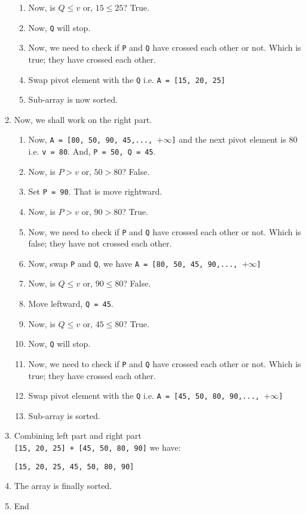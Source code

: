 \documentclass[a4paper,12pt]{article}
\theoremstyle{definition}
\begin{document}
\begin{enumerate}
\begin{enumerate}
            \item Now, is $Q \leq v$ or, $15 \leq 25$? True.
            \item Now, \texttt{Q} will stop.
            \item Now, we need to check if \texttt{P} and \texttt{Q} have crossed each other or not.
            Which is true; they have crossed each other.
            \item Swap pivot element with the \texttt{Q} i.e. \texttt{A = [15, 20, 25]}
            \item Sub-array is now sorted.
        \end{enumerate}
        \item Now, we shall work on the right part.
        \begin{enumerate}
            \item Now, \texttt{A = [80, 50, 90, 45,..., $+\infty$]} and the next pivot element is 80 i.e.
            \texttt{v = 80}.
            And, \texttt{P = 50, Q = 45}.
            \item Now, is $P > v$ or, $50 > 80$? False.
            \item Set \texttt{P = 90}.
            That is move rightward.
            \item Now, is $P > v$ or, $90 > 80$? True.
            \item Now, we need to check if \texttt{P} and \texttt{Q} have crossed each other or not.
            Which is false; they have not crossed each other.
            \item Now, swap \texttt{P} and \texttt{Q}, we have \texttt{A = [80, 50, 45, 90,..., $+\infty$]}
            \item Now, is $Q \leq v$ or, $90 \leq 80$? False.
            \item Move leftward, \texttt{Q = 45}.
            \item Now, is $Q \leq v$ or, $45 \leq 80$? True.
            \item Now, \texttt{Q} will stop.
            \item Now, we need to check if \texttt{P} and \texttt{Q} have crossed each other or not.
            Which is true; they have crossed each other.
            \item Swap pivot element with the \texttt{Q} i.e. \texttt{A = [45, 50, 80, 90,..., $+\infty$]}
            \item Sub-array is sorted.
        \end{enumerate}

        \item Combining left part and right part \\
        \texttt{[15, 20, 25] + [45, 50, 80, 90]} we have:
        \begin{center}
            \texttt{[15, 20, 25, 45, 50, 80, 90]}
        \end{center}
        \item The array is finally sorted.
        \item End
    \end{enumerate}
\end{document}
